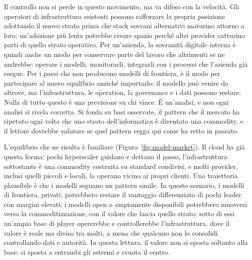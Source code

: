 \documentclass[10pt,oneside,openany]{book}
\begin{document}
Il controllo non si perde in questo movimento, ma va difeso con la velocità. Gli operatori di infrastruttura esistenti possono rafforzare la propria posizione adottando il nuovo strato prima che stack sovrani alternativi maturino attorno a loro; un'adozione più lenta potrebbe creare spazio perché altri provider catturino parti di quello strato operativo. Per un'azienda, la sovranità digitale interna è quindi anche un modo per conservare parte del lavoro che altrimenti se ne andrebbe: operare i modelli, monitorarli, integrarli con i processi che l'azienda già esegue. Per i paesi che non producono modelli di frontiera, è il modo per partecipare al nuovo equilibrio anziché importarlo: il modello può venire da altrove, ma l'infrastruttura, le operation, la governance e i dati possono restare. Nulla di tutto questo è una previsione su chi vince. È un'analisi, e non ogni analisi si rivela corretta. Si fonda su basi osservate, il pattern che il mercato ha ripetuto ogni volta che uno strato dell'informatica è diventato una commodity, e il lettore dovrebbe valutare se quel pattern regga qui come ha retto in passato.

L'equilibrio che ne risulta è familiare (Figura~\ref{fig:model-market}). Il cloud ha già questa forma: pochi hyperscaler guidano e dettano il passo, l'infrastruttura sottostante è una commodity costruita su standard condivisi, e molti provider, inclusi quelli piccoli e locali, la operano vicino ai propri clienti. Una traiettoria plausibile è che i modelli seguano un pattern simile. In questo scenario, i modelli di frontiera, privati, potrebbero restare il vantaggio differenziato di pochi leader con margini elevati; i modelli open o ampiamente disponibili potrebbero muoversi verso la commoditizzazione, con il valore che lascia quello strato; sotto di essi un'ampia base di player opererebbe e controllerebbe l'infrastruttura, dove il valore è reale ma diviso tra molti, a meno che qualcuno non lo consolidi controllando dati e autorità. In questa lettura, il valore non si sposta soltanto alla base: si sposta a entrambi gli estremi e svuota il centro.
\end{document}
